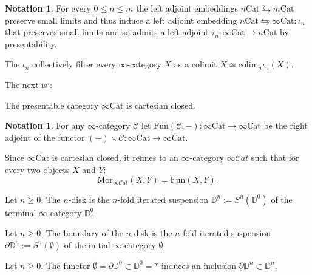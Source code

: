 \documentclass[10pt,oneside]{article}
\numberwithin{equation}{section} %
\numberwithin{figure}{section} %
\theoremstyle{plain}
\theoremstyle{definition}
\newtheorem{notation}[thm]{Notation}
\newcommand{\bD}{{\mathbb D}}
\newcommand{\mC}{{\mathcal C}}
\newcommand{\m}{{m}}
\newcommand{\n}{{n}}
\newcommand{\colim}{\mathrm{colim}}
\newcommand{\Cat}{\mathrm{Cat}}
\newcommand{\Fun}{\mathrm{Fun}}
\newcommand{\Mor}{{\mathrm{Mor}}}
\newcommand{\scat}{\mathcal{C}\mathit{at}}
\begin{document}
\begin{notation}
For every $0 \leq \n \leq \m$ the left adjoint embeddings $\n\Cat \leftrightarrows \m\Cat$ preserve small limits and thus induce a left adjoint embedding $\n\Cat \leftrightarrows \infty\Cat: \iota_\n$ that preserves small limits
and so admits a left adjoint $\tau_\n: \infty\Cat \to \n\Cat$ by presentability.

\end{notation}

\begin{remark}
The $\iota_n$ collectively filter every $\infty$-category $X$ as a colimit $X\simeq\colim_{n}\iota_n(X)$.
\end{remark}

The next is \cite[Lemma 2.4.16.]{GepnerHeine2026}:

\begin{lemma}\label{carclo}
The presentable category $\infty\Cat$ is cartesian closed.
\end{lemma}

\begin{notation}

For any $\infty$-category $\mC$ let 
$\Fun(\mC,-): \infty\Cat \to \infty\Cat$ be the right adjoint of the functor $(-) \times \mC:\infty\Cat \to \infty\Cat.$
    
\end{notation}

\begin{remark}
Since $\infty\Cat$ is cartesian closed, it refines to an $\infty$-category $\infty\scat$ such that for every two objects $X$ and $Y$:
\[
\Mor_{\infty\scat}(X,Y)=\Fun(X,Y).
\]
\end{remark}



\begin{definition}Let $\n \geq 0$.
The $\n$-disk is the $n$-fold iterated suspension $\bD^\n:= S^{\n}(\bD^0)$ of the terminal $\infty$-category $\bD^0$.
\end{definition}



\begin{definition}Let $\n \geq 0$.
The boundary of the $\n$-disk is the $n$-fold iterated suspension $\partial\bD^\n:= S^{\n}(\emptyset)$ of the initial $\infty$-category $\emptyset$.
	
\end{definition}

\begin{remark}Let $\n \geq 0.$
The functor $\emptyset=\partial\bD^0 \subset \bD^0=*$ induces an inclusion $\partial\bD^\n \subset \bD^\n$.
	
\end{remark}
\end{document}
